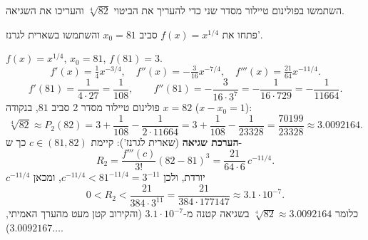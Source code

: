 
\begin{question}
השתמשו בפולינום טיילור מסדר שני כדי להעריך את הביטוי $\sqrt[4]{82}$ והעריכו את השגיאה.
\end{question}

\begin{hint}
פתחו את $f(x)=x^{1/4}$ סביב $x_0=81$ והשתמשו בשארית לגרנז'.
\end{hint}

\begin{solution}
$f(x)=x^{1/4}$, $x_0=81$, $f(81)=3$.
\[ f'(x)=\tfrac14x^{-3/4},\quad f''(x)=-\tfrac{3}{16}x^{-7/4},\quad f'''(x)=\tfrac{21}{64}x^{-11/4}. \]
\[ f'(81)=\frac{1}{4\cdot27}=\frac{1}{108},\qquad f''(81)=-\frac{3}{16\cdot 3^7}=-\frac{1}{16\cdot729}=-\frac{1}{11664}. \]
פולינום טיילור מסדר 2 סביב $81$, בנקודה $x=82$ ($x-x_0=1$):
\[ \sqrt[4]{82}\approx P_2(82)=3+\frac{1}{108}-\frac{1}{2\cdot11664}=3+\frac{1}{108}-\frac{1}{23328}=\frac{70199}{23328}\approx 3.0092164. \]
\textbf{הערכת שגיאה} (שארית לגרנז'): קיימת $c\in(81,82)$ כך ש-
\[ R_2=\frac{f'''(c)}{3!}(82-81)^3=\frac{21}{64\cdot 6}\,c^{-11/4}. \]
$c^{-11/4}$ יורדת, ולכן $c^{-11/4}<81^{-11/4}=3^{-11}$, ומכאן
\[ 0<R_2<\frac{21}{384\cdot 3^{11}}=\frac{21}{384\cdot177147}\approx 3.1\cdot10^{-7}. \]
כלומר $\sqrt[4]{82}\approx3.0092164$ בשגיאה קטנה מ-$3.1\cdot 10^{-7}$ (והקירוב קטן מעט מהערך האמיתי, $3.0092167\ldots$).
\end{solution}
